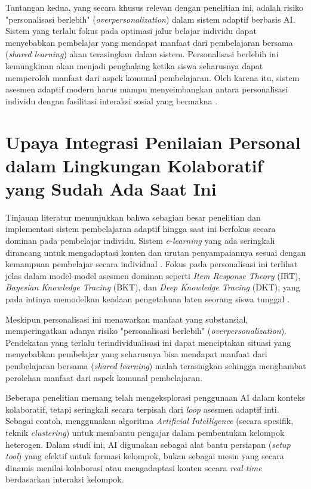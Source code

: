 Tantangan kedua, yang secara khusus relevan dengan penelitian ini, adalah risiko
"personalisasi berlebih" (\textit{overpersonalization}) dalam sistem adaptif
berbasis AI. Sistem yang terlalu fokus pada optimasi jalur belajar individu dapat
menyebabkan pembelajar yang mendapat manfaat dari pembelajaran
bersama (\textit{shared learning}) akan terasingkan dalam sistem.
Personalisasi berlebih ini kemungkinan akan menjadi penghalang ketika siswa
seharusnya dapat memperoleh manfaat dari aspek komunal pembelajaran. Oleh karena itu,
sistem asesmen adaptif modern harus mampu menyeimbangkan antara personalisasi
individu dengan fasilitasi interaksi sosial yang bermakna \autocite{Halkiopoulos2024}.

\section{Upaya Integrasi Penilaian Personal dalam Lingkungan Kolaboratif yang Sudah Ada Saat Ini}
\label{sec:upaya_integrasi}

Tinjauan literatur menunjukkan bahwa sebagian besar penelitian dan
implementasi sistem pembelajaran adaptif hingga saat ini berfokus secara
dominan pada pembelajar individu. Sistem \textit{e-learning} yang ada seringkali
dirancang untuk mengadaptasi konten dan urutan penyampaiannya sesuai dengan
kemampuan pembelajar secara individual \autocite{Halkiopoulos2024}. Fokus pada
personalisasi ini terlihat jelas dalam model-model asesmen dominan seperti
\textit{Item Response Theory} (IRT), \textit{Bayesian Knowledge Tracing} (BKT),
dan \textit{Deep Knowledge Tracing} (DKT), yang pada intinya memodelkan keadaan
pengetahuan laten seorang siswa tunggal \autocite{Minn2022}.

Meskipun personalisasi ini menawarkan manfaat yang substansial,
\textcite{Halkiopoulos2024} memperingatkan adanya risiko "personalisasi berlebih"
(\textit{overpersonalization}). Pendekatan yang terlalu terindividualisasi ini
dapat menciptakan situasi yang menyebabkan pembelajar yang seharusnya bisa
mendapat manfaat dari pembelajaran bersama (\textit{shared learning}) malah
terasingkan sehingga menghambat perolehan manfaat dari aspek komunal
pembelajaran.

Beberapa penelitian memang telah mengeksplorasi penggunaan AI dalam konteks
kolaboratif, tetapi seringkali secara terpisah dari \textit{loop} asesmen adaptif
inti. Sebagai contoh, \textcite{Nalli2022} menggunakan algoritma
\textit{Artificial Intelligence} (secara spesifik, teknik \textit{clustering})
untuk membantu pengajar dalam pembentukan kelompok heterogen. Dalam studi ini,
AI digunakan sebagai alat bantu persiapan (\textit{setup tool}) yang efektif
untuk formasi kelompok, bukan sebagai mesin yang secara dinamis menilai kolaborasi
atau mengadaptasi konten secara \textit{real-time} berdasarkan interaksi kelompok.

